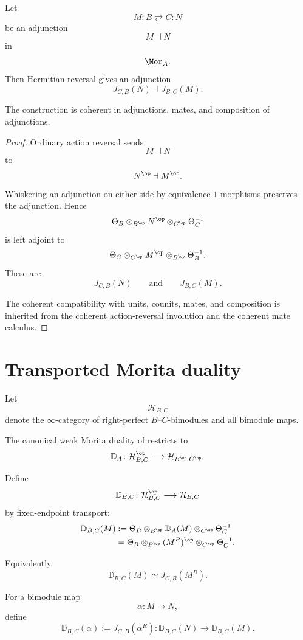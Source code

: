 \begin{lemma}
\label{lem:hermitian-reversal-adjunction}
Let
\[
    M
    \colon
    B
    \rightleftarrows
    C
    \colon
    N
\]
be an adjunction
\[
    M\dashv N
\]
in
\[
    \Mor_A.
\]
Then Hermitian reversal gives an adjunction
\[
    J_{C,B}(N)
    \dashv
    J_{B,C}(M).
\]

The construction is coherent in adjunctions, mates, and composition of
adjunctions.
\end{lemma}

\begin{proof}
Ordinary action reversal sends
\[
    M\dashv N
\]
to
\[
    N^{\op}\dashv M^{\op}.
\]
Whiskering an adjunction on either side by equivalence
$1$-morphisms preserves the adjunction. Hence
\[
    \Theta_B
    \otimes_{B^{\op}}
    N^{\op}
    \otimes_{C^{\op}}
    \Theta_C^{-1}
\]
is left adjoint to
\[
    \Theta_C
    \otimes_{C^{\op}}
    M^{\op}
    \otimes_{B^{\op}}
    \Theta_B^{-1}.
\]
These are
\[
    J_{C,B}(N)
    \qquad\text{and}\qquad
    J_{B,C}(M).
\]

The coherent compatibility with units, counits, mates, and composition
is inherited from the coherent action-reversal involution and the
coherent mate calculus.
\end{proof}

\section{Transported Morita duality}
\label{sec:transported-morita-duality}

Let
\[
    \mathcal H_{B,C}
\]
denote the $\infty$-category of right-perfect
$B$--$C$-bimodules and all bimodule maps.

The canonical weak Morita duality of
restricts to
\[
    \mathbb D_A
    \colon
    \mathcal H_{B,C}^{\op}
    \longrightarrow
    \mathcal H_{B^{\op},C^{\op}}.
\]

\begin{construction}
\label{con:transported-morita-duality}
Define
\[
    \mathbb D_{B,C}
    \colon
    \mathcal H_{B,C}^{\op}
    \longrightarrow
    \mathcal H_{B,C}
\]
by fixed-endpoint transport:
\[
\begin{aligned}
    \mathbb D_{B,C}(M)
    &:=
    \Theta_B
    \otimes_{B^{\op}}
    \mathbb D_A(M)
    \otimes_{C^{\op}}
    \Theta_C^{-1}
    \\
    &=
    \Theta_B
    \otimes_{B^{\op}}
    (M^R)^{\op}
    \otimes_{C^{\op}}
    \Theta_C^{-1}.
\end{aligned}
\]

Equivalently,
\[
    \mathbb D_{B,C}(M)
    \simeq
    J_{C,B}(M^R).
\]

For a bimodule map
\[
    \alpha
    \colon
    M
    \longrightarrow
    N,
\]
define
\[
    \mathbb D_{B,C}(\alpha)
    :=
    J_{C,B}(\alpha^R)
    \colon
    \mathbb D_{B,C}(N)
    \longrightarrow
    \mathbb D_{B,C}(M).
\]
\end{construction}

